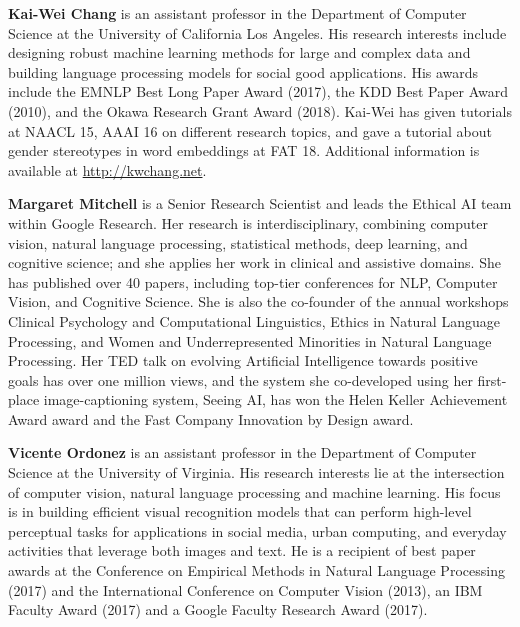 \clearpage
\begin{bio}

\textbf{Kai-Wei Chang} is an assistant professor in the Department of Computer Science at the University of California Los Angeles. His research interests include designing robust machine learning methods for large and complex data and building language processing models for social good applications. His awards include the EMNLP Best Long Paper Award (2017), the KDD Best Paper Award (2010), and the Okawa Research Grant Award (2018). Kai-Wei has given tutorials at NAACL 15, AAAI 16 on different research topics, and gave a tutorial about gender stereotypes in word embeddings at FAT 18. Additional information is available at \url{http://kwchang.net}.


\textbf{Margaret Mitchell} is a Senior Research Scientist and leads the Ethical AI team within Google Research. Her research is interdisciplinary, combining computer vision, natural language processing, statistical methods, deep learning, and cognitive science; and she applies her work in clinical and assistive domains. She has published over 40 papers, including top-tier conferences for NLP, Computer Vision, and Cognitive Science. She is also the co-founder of the annual workshops Clinical Psychology and Computational Linguistics, Ethics in Natural Language Processing, and Women and Underrepresented Minorities in Natural Language Processing. Her TED talk on evolving Artificial Intelligence towards positive goals has over one million views, and the system she co-developed using her first-place image-captioning system, Seeing AI, has won the Helen Keller Achievement Award award and the Fast Company Innovation by Design award.


\textbf{Vicente Ordonez} is an assistant professor in the Department of Computer Science at the University of Virginia. His research interests lie at the intersection of computer vision, natural language processing and machine learning. His focus is in building efficient visual recognition models that can perform high-level perceptual tasks for applications in social media, urban computing, and everyday activities that leverage both images and text. He is a recipient of best paper awards at the Conference on Empirical Methods in Natural Language Processing (2017) and the International Conference on Computer Vision (2013), an IBM Faculty Award (2017) and a Google Faculty Research Award (2017).


\end{bio}
